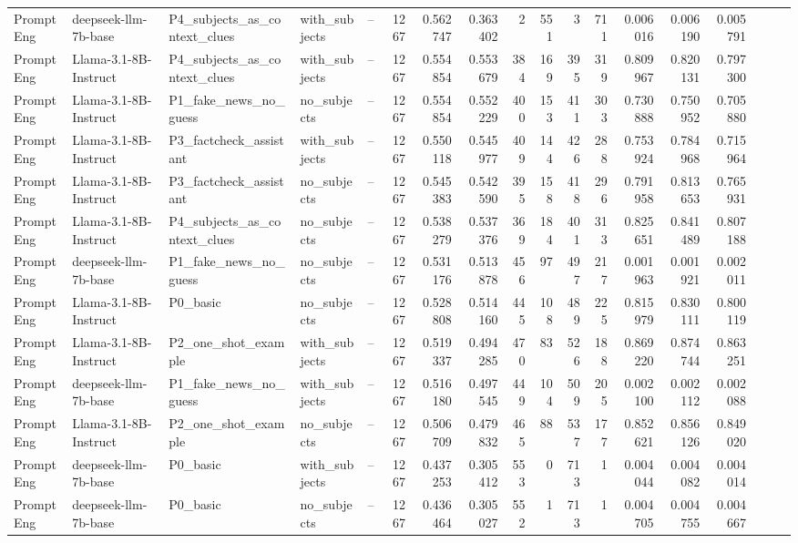 \begin{landscape}
\begin{longtable}{l P{2.9cm} P{4cm} l P{2.2cm} r r r r r r r r r r r r r}
PromptEng & deepseek-llm-7b-base & P4\_subjects\_as\_context\_clues & with\_subjects & -- & 1267 & 0.562747 & 0.363402 & 2 & 551 & 3 & 711 & 0.006016 & 0.006190 & 0.005791\\
PromptEng & Llama-3.1-8B-Instruct & P4\_subjects\_as\_context\_clues & with\_subjects & -- & 1267 & 0.554854 & 0.553679 & 384 & 169 & 395 & 319 & 0.809967 & 0.820131 & 0.797300\\
PromptEng & Llama-3.1-8B-Instruct & P1\_fake\_news\_no\_guess & no\_subjects & -- & 1267 & 0.554854 & 0.552229 & 400 & 153 & 411 & 303 & 0.730888 & 0.750952 & 0.705880\\
PromptEng & Llama-3.1-8B-Instruct & P3\_factcheck\_assistant & with\_subjects & -- & 1267 & 0.550118 & 0.545977 & 409 & 144 & 426 & 288 & 0.753924 & 0.784968 & 0.715964\\
PromptEng & Llama-3.1-8B-Instruct & P3\_factcheck\_assistant & no\_subjects & -- & 1267 & 0.545383 & 0.542590 & 395 & 158 & 418 & 296 & 0.791958 & 0.813653 & 0.765931\\
PromptEng & Llama-3.1-8B-Instruct & P4\_subjects\_as\_context\_clues & no\_subjects & -- & 1267 & 0.538279 & 0.537376 & 369 & 184 & 401 & 313 & 0.825651 & 0.841489 & 0.807188\\
PromptEng & deepseek-llm-7b-base & P1\_fake\_news\_no\_guess & no\_subjects & -- & 1267 & 0.531176 & 0.513878 & 456 & 97 & 497 & 217 & 0.001963 & 0.001921 & 0.002011\\
PromptEng & Llama-3.1-8B-Instruct & P0\_basic & no\_subjects & -- & 1267 & 0.528808 & 0.514160 & 445 & 108 & 489 & 225 & 0.815979 & 0.830111 & 0.800119\\
PromptEng & Llama-3.1-8B-Instruct & P2\_one\_shot\_example & with\_subjects & -- & 1267 & 0.519337 & 0.494285 & 470 & 83 & 526 & 188 & 0.869220 & 0.874744 & 0.863251\\
PromptEng & deepseek-llm-7b-base & P1\_fake\_news\_no\_guess & with\_subjects & -- & 1267 & 0.516180 & 0.497545 & 449 & 104 & 509 & 205 & 0.002100 & 0.002112 & 0.002088\\
PromptEng & Llama-3.1-8B-Instruct & P2\_one\_shot\_example & no\_subjects & -- & 1267 & 0.506709 & 0.479832 & 465 & 88 & 537 & 177 & 0.852621 & 0.856126 & 0.849020\\
PromptEng & deepseek-llm-7b-base & P0\_basic & with\_subjects & -- & 1267 & 0.437253 & 0.305412 & 553 & 0 & 713 & 1 & 0.004044 & 0.004082 & 0.004014\\
PromptEng & deepseek-llm-7b-base & P0\_basic & no\_subjects & -- & 1267 & 0.436464 & 0.305027 & 552 & 1 & 713 & 1 & 0.004705 & 0.004755 & 0.004667\\


\end{longtable}
\end{landscape}
